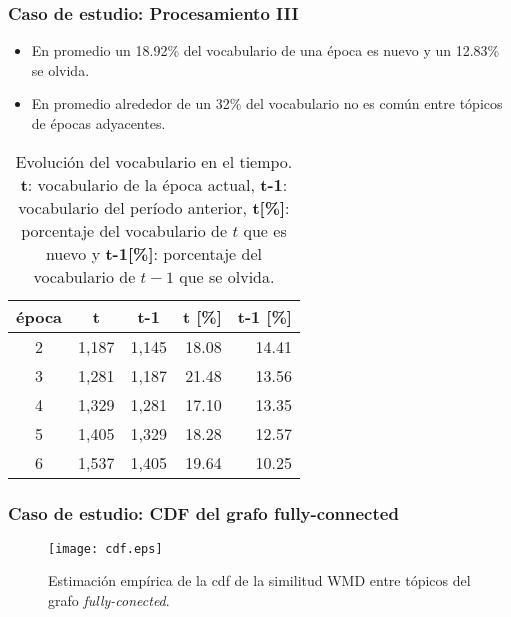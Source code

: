 \documentclass[
	spanish, %
	aspectratio=43, %
	hyperref={pdfencoding=auto,psdextra},
	xcolor={dvipsnames,table,usenames},
]{beamer}
\begin{document}
\begin{frame}[t]
\frametitle{Caso de estudio: Procesamiento III}
\begin{itemize}
  \item En promedio un 18.92\% del vocabulario de una época es nuevo y un 12.83\% se olvida.
  \item En promedio alrededor de un 32\% del vocabulario no es común entre tópicos de épocas adyacentes. 
\end{itemize}
\begin{table}[H]
\begin{tabular}{|c|r|r|r|r|}
\hline
\textbf{época} & \multicolumn{1}{c|}{\textbf{t}} & \multicolumn{1}{c|}{\textbf{t-1}} & \multicolumn{1}{c|}{\textbf{t {[}\%{]}}} & \multicolumn{1}{l|}{\textbf{t-1 {[}\%{]}}} \\ \hline
2     & 1,187                  & 1,145                    & 18.08                            & 14.41                              \\ \hline
3     & 1,281                  & 1,187                    & 21.48                            & 13.56                              \\ \hline
4     & 1,329                  & 1,281                    & 17.10                            & 13.35                              \\ \hline
5     & 1,405                  & 1,329                    & 18.28                            & 12.57                              \\ \hline
6     & 1,537                  & 1,405                    & 19.64                            & 10.25                              \\ \hline
\end{tabular}
\caption{Evolución del vocabulario en el tiempo. \textbf{t}: vocabulario de la época actual, \textbf{t-1}: vocabulario del período anterior, \textbf{t[\%]}: porcentaje del vocabulario de $t $ que es nuevo y\textbf{ t-1[\%]}: porcentaje del vocabulario de $t-1$ que se olvida.}
\end{table}


\end{frame}


\begin{frame}[t]
\frametitle{Caso de estudio: CDF del grafo fully-connected}

\begin{figure}
\texttt{[image: cdf.eps]}
\caption{Estimación empírica de la cdf de la similitud WMD entre tópicos del grafo \textit{fully-conected}.}
\label{img:cdf_wmd}
\end{figure}

\end{frame}
\end{document}
